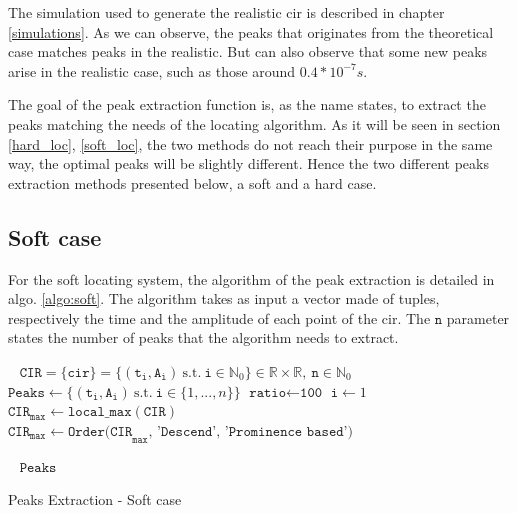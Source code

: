 The simulation used to generate the realistic \gls{cir} is described in chapter \ref{simulations}. As we can observe, the peaks that originates from the theoretical case matches peaks in the realistic. But can also observe that some new peaks arise in the realistic case, such as those around $0.4*10^{-7}s$. 
\vspace{2mm}

The goal of the peak extraction function is, as the name states, to extract the peaks matching the needs of the locating algorithm. As it will be seen in section \ref{hard_loc}, \ref{soft_loc}, the two methods do not reach their purpose in the same way, the optimal peaks will be slightly different. Hence the two different peaks extraction methods presented below, a soft and a hard case.

\subsection{Soft case}

For the soft locating system, the algorithm of the peak extraction is detailed in algo. \ref{algo:soft}. The algorithm takes as input a vector made of tuples, respectively the time and the amplitude of each point of the \gls{cir}. The $\texttt{n}$ parameter states the number of peaks that the algorithm needs to extract.
\vspace{2mm}


\begin{algorithm}[H]
 \KwInput{}\
 \hspace*{\algorithmicindent} $\mathtt{CIR} = \{\mathtt{cir}\} = \{ (\mathtt{t_i}, \mathtt{A_i}) ~\text{s.t.} ~\mathtt{i} \in \mathbb{N}_0\} \in \mathbb{R} \times \mathbb{R}, ~\mathtt{n} \in \mathbb{N}_0$ \;
\KwInit{}
\hspace*{\algorithmicindent} $\texttt{Peaks} \longleftarrow \{ (\mathtt{t_i}, \mathtt{A_i}) ~\text{s.t.} ~\mathtt{i} \in \{ 1, ..., n \} \}$\;
\hspace*{\algorithmicindent} $\texttt{ratio} \longleftarrow \texttt{100}$\;
\hspace*{\algorithmicindent} $\texttt{i} \longleftarrow 1$\;
\hspace*{\algorithmicindent} $\texttt{CIR}_\texttt{max} \longleftarrow \texttt{local\_max}(\texttt{CIR})$\;
\hspace*{\algorithmicindent} $\texttt{CIR}_\texttt{max} \longleftarrow \texttt{Order(CIR}_\texttt{max}\texttt{, 'Descend', 'Prominence based')}$\;


 \KwOutput{}\
 \hspace*{\algorithmicindent} $\texttt{Peaks}$\;
 \caption{Peaks Extraction - Soft case \label{algo:soft}}
\end{algorithm}
\vspace{2mm}

